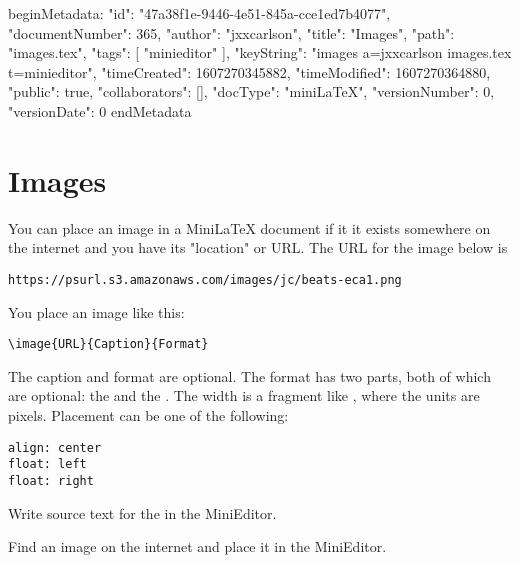 beginMetadata:
{
    "id": "47a38f1e-9446-4e51-845a-cce1ed7b4077",
    "documentNumber": 365,
    "author": "jxxcarlson",
    "title": "Images",
    "path": "images.tex",
    "tags": [
        "minieditor"
    ],
    "keyString": "images a=jxxcarlson images.tex t=minieditor",
    "timeCreated": 1607270345882,
    "timeModified": 1607270364880,
    "public": true,
    "collaborators": [],
    "docType": "miniLaTeX",
    "versionNumber": 0,
    "versionDate": 0
}
endMetadata


\setcounter{section}{7}

\section{Images}

You can place an image in a MiniLaTeX document if it it exists somewhere on the internet and you have its "location" or URL.  The URL for the image below is

\begin{verbatim}
https://psurl.s3.amazonaws.com/images/jc/beats-eca1.png
\end{verbatim}

You place an image like this:

\begin{verbatim}
\image{URL}{Caption}{Format}
\end{verbatim}

The caption and format are optional.  The format has two parts, both of which are optional: the  and the . The width is a fragment like , where the units are pixels.  Placement can be one of the following:

\begin{verbatim}
align: center
float: left
float: right
\end{verbatim}




 Write source text for the  in the MiniEditor.

 Find an image on the internet and place it  in the MiniEditor.
